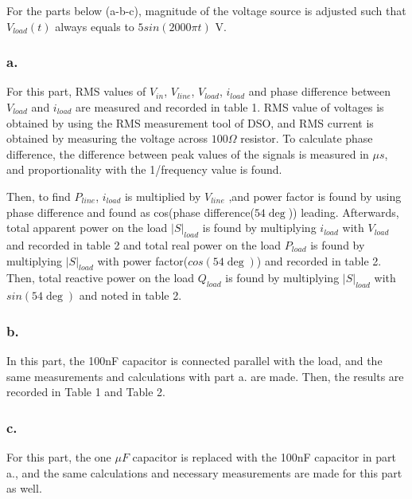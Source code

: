 \documentclass[letterpaper,12pt]{article}
\begin{document}
For the parts below (a-b-c), magnitude of the voltage source is adjusted such that \(V_{load}(t)\) always equals to \(5sin(2000\pi t)\) V. 

\subsubsection{a.}
For this part, RMS values of \(V_{in}\), \(V_{line}\), \(V_{load}\), \(i_{load}\) and phase difference between \(V_{load}\) and \(i_{load}\) are measured and recorded in table 1. RMS value of voltages is obtained by using the RMS measurement tool of DSO, and RMS current is obtained by measuring the voltage across \(100\Omega\) resistor. To calculate phase difference, the difference between peak values of the signals is measured in \(\mu s\), and proportionality with the 1/frequency value is found.


Then, to find \(P_{line}\), \(i_{load}\) is multiplied by \(V_{line}\) ,and power factor is found by using phase difference and found as cos(phase difference(\(54\deg \))) leading. Afterwards, total apparent power on the load \(|S|_{load}\) is found by multiplying \(i_{load}\) with \(V_{load}\) and recorded in table 2 and total real power on the load \(P_{load}\) is found by multiplying \(|S|_{load}\) with power factor(\(cos(54\deg )\)) and recorded in table 2. Then, total reactive power on the load \(Q_{load}\) is found by multiplying \(|S|_{load}\) with \(sin(54\deg )\) and noted in table 2.
\subsubsection{b.}
In this part, the 100nF capacitor is connected parallel with the load, and the same measurements and calculations with part a. are made. Then, the results are recorded in Table 1 and Table 2.   
\subsubsection{c.}
For this part, the one \(\mu F\) capacitor is replaced with the 100nF capacitor in part a., and the same calculations and necessary measurements are made for this part as well.
\end{document}
